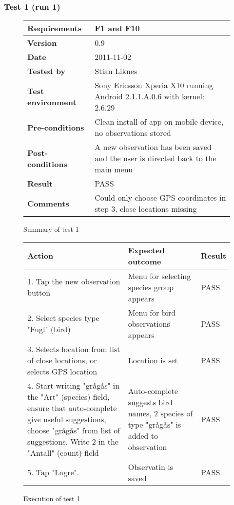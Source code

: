\newpage
\subsubsection{Test 1 (run 1)}

	\begin{figure}[htb]
		\centering
		\begin{tabular}{|p{3.5cm}|p{7.0cm}|} \hline
			\textbf{Requirements} & F1 and F10 \\ \hline
			\textbf{Version} & 0.9 \\ \hline
			\textbf{Date} & 2011-11-02 \\ \hline
			\textbf{Tested by} & Stian Liknes \\ \hline
			\textbf{Test environment} & Sony Ericsson Xperia X10 running Android 2.1.1.A.0.6 with kernel: 2.6.29 \\ \hline
			\textbf{Pre-conditions} & Clean install of app on mobile device, no observations stored \\ \hline
			\textbf{Post-conditions} & A new observation has been saved and the user is directed back to the main menu \\ \hline
			\textbf{Result} & PASS \\ \hline
			\textbf{Comments} & Could only choose GPS coordinates in step 3, close locations missing \\ \hline
		\end{tabular}
		\caption{Summary of test 1}
	\end{figure}

	\begin{figure}[htb]
		\centering
		\begin{tabular}{|p{5.0cm}|p{5.0cm}|p{1cm}|}
			\hline \textbf{Action} & \textbf{Expected outcome} & \textbf{Result} \\ \hline
			1. Tap the new observation button & Menu for selecting species group appears & PASS \\ \hline
			2. Select species type "Fugl" (bird) & Menu for bird observations appears & PASS \\ \hline
			3. Selects location from list of close locations, or selects GPS location & Location is set & PASS \\ \hline
			4. Start writing "grågås" in the "Art" (species) field, ensure that
			auto-complete give useful suggestions, choose "grågås" from list of
			suggestions. Write 2 in the "Antall" (count) field & Auto-complete
			suggests bird names, 2 species of type "grågås" is added to observation
			& PASS \\ \hline 
			5. Tap "Lagre". & Observatin is saved & PASS \\ \hline
		\end{tabular}
		\caption{Execution of test 1}
	\end{figure}

